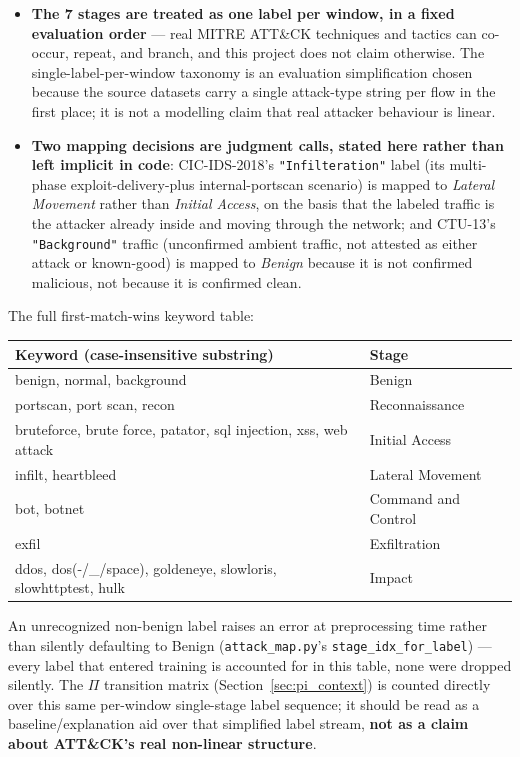 \documentclass[11pt]{article}
\newcommand{\code}[1]{\texttt{#1}}
\begin{document}
\begin{itemize}[leftmargin=1.5em]
  \item \textbf{The 7 stages are treated as one label per window, in a fixed evaluation order}
  --- real MITRE ATT\&CK techniques and tactics can co-occur, repeat, and branch, and this
  project does not claim otherwise. The single-label-per-window taxonomy is an evaluation
  simplification chosen because the source datasets carry a single attack-type string per flow
  in the first place; it is not a modelling claim that real attacker behaviour is linear.
  \item \textbf{Two mapping decisions are judgment calls, stated here rather than left implicit
  in code}: CIC-IDS-2018's \code{"Infilteration"} label (its multi-phase exploit-delivery-plus
  internal-portscan scenario) is mapped to \emph{Lateral Movement} rather than \emph{Initial
  Access}, on the basis that the labeled traffic is the attacker already inside and moving
  through the network; and CTU-13's \code{"Background"} traffic (unconfirmed ambient traffic,
  not attested as either attack or known-good) is mapped to \emph{Benign} because it is not
  confirmed malicious, not because it is confirmed clean.
\end{itemize}

\noindent The full first-match-wins keyword table:

\begin{center}
\small
\begin{tabular}{ll}
\toprule
\textbf{Keyword (case-insensitive substring)} & \textbf{Stage} \\
\midrule
benign, normal, background & Benign \\
portscan, port scan, recon & Reconnaissance \\
bruteforce, brute force, patator, sql injection, xss, web attack & Initial Access \\
infilt, heartbleed & Lateral Movement \\
bot, botnet & Command and Control \\
exfil & Exfiltration \\
ddos, dos(-/\_/space), goldeneye, slowloris, slowhttptest, hulk & Impact \\
\bottomrule
\end{tabular}
\end{center}

\noindent An unrecognized non-benign label raises an error at preprocessing time rather than
silently defaulting to Benign (\code{attack\_map.py}'s \code{stage\_idx\_for\_label}) --- every
label that entered training is accounted for in this table, none were dropped silently. The
$\Pi$ transition matrix (Section~\ref{sec:pi_context}) is counted directly over this same
per-window single-stage label sequence; it should be read as a baseline/explanation aid over
that simplified label stream, \textbf{not as a claim about ATT\&CK's real non-linear
structure}.
\end{document}
